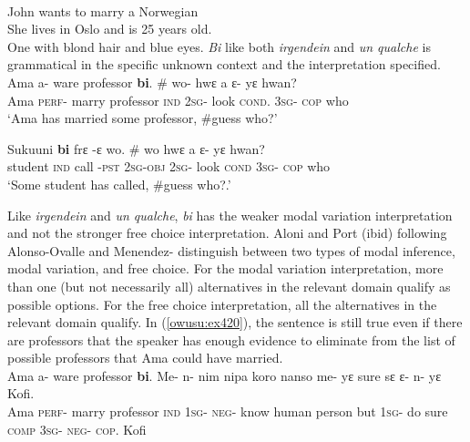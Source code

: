 \documentclass[output=paper,modfonts,nonflat,draftmode]{langsci/langscibook}
\begin{document}
\ea\label{owusu:ex40}\\
 John wants to marry a Norwegian\\
 \ea
 She lives in Oslo and is 25 years old.\\
\ex One with blond hair and blue eyes.
\z\z
\emph{Bi} like both \emph{irgendein} and \emph{un qualche} is grammatical in the specific unknown context  and the interpretation specified. 
\ea {}\\
\ea\label{owusu:ex42}
 \gll  Ama a- ware professor \textbf{bi}. \# wo- hwε a ε- yε hwan?\\
Ama \textsc{perf}- marry professor \textsc{ind} {} \textsc{2sg}- look  \textsc{cond}. \textsc{3sg}- \textsc{cop} who \\
    
\glt `Ama has married some professor, \#guess who?' 

\ex 
\gll  Sukuuni \textbf{bi} frε -ε wo. \# wo hwε a ε- yε hwan?\\
student  \textsc{ind} call -\textsc{pst}       \textsc{2sg}-\textsc{obj} {} \textsc{2sg}- look  \textsc{cond} \textsc{3sg}- \textsc{cop} who\\
    
\glt `Some student has called, \#guess who?.' 
\z \z

Like \emph{irgendein} and \emph{un qualche}, \emph{bi} has the weaker modal variation interpretation and not the stronger free choice interpretation. Aloni and Port (ibid) following Alonso-Ovalle and Menendez-\citet{Benito2010} distinguish between two types of modal inference, modal variation, and free choice. 
For the modal variation interpretation, more than one (but not necessarily all) alternatives in the relevant domain qualify as possible options. For the free choice interpretation, all the alternatives in the relevant domain qualify. In (\ref{owusu:ex420}), the sentence is still true even if there are professors that the speaker has enough evidence to eliminate from the list of possible professors that Ama could have married.
\ea\label{owusu:ex420}\\
 \gll  Ama a- ware professor \textbf{bi}. Me- n- nim nipa koro nanso me- yε sure sε ε- n- yε Kofi.\\
Ama \textsc{perf}- marry professor \textsc{ind} \textsc{1sg}- \textsc{neg}- know human person but \textsc{1sg}- do sure \textsc{comp}  \textsc{3sg}- \textsc{neg}- \textsc{cop}. Kofi \\
    
\end{document}
